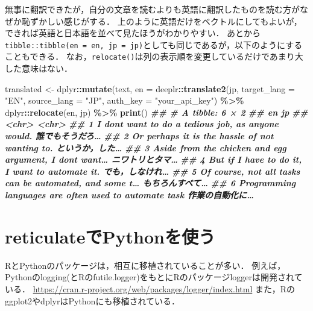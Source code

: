 \documentclass[
]{article}
\newenvironment{Shaded}{\begin{snugshade}}{\end{snugshade}}
\newcommand{\AttributeTok}[1]{\textcolor[rgb]{0.13,0.29,0.53}{#1}}
\newcommand{\DocumentationTok}[1]{\textcolor[rgb]{0.56,0.35,0.01}{\textbf{\textit{#1}}}}
\newcommand{\FunctionTok}[1]{\textcolor[rgb]{0.13,0.29,0.53}{\textbf{#1}}}
\newcommand{\NormalTok}[1]{#1}
\newcommand{\OtherTok}[1]{\textcolor[rgb]{0.56,0.35,0.01}{#1}}
\newcommand{\SpecialCharTok}[1]{\textcolor[rgb]{0.81,0.36,0.00}{\textbf{#1}}}
\newcommand{\StringTok}[1]{\textcolor[rgb]{0.31,0.60,0.02}{#1}}
\begin{document}
無事に翻訳できたが，自分の文章を読むよりも英語に翻訳したものを読む方がなぜか恥ずかしい感じがする．
上のように英語だけをベクトルにしてもよいが，できれば英語と日本語を並べて見たほうがわかりやすい．
あとから\texttt{tibble::tibble(en\ =\ en,\ jp\ =\ jp)}としても同じであるが，以下のようにすることもできる．
なお，\texttt{relocate()}は列の表示順を変更しているだけであまり大した意味はない．

\begin{Shaded}
\begin{Highlighting}[]
\NormalTok{translated }\OtherTok{\textless{}{-}} 
\NormalTok{  dplyr}\SpecialCharTok{::}\FunctionTok{mutate}\NormalTok{(text, }\AttributeTok{en =}\NormalTok{ deeplr}\SpecialCharTok{::}\FunctionTok{translate2}\NormalTok{(jp, }
    \AttributeTok{target\_lang =} \StringTok{"EN"}\NormalTok{, }\AttributeTok{source\_lang =} \StringTok{"JP"}\NormalTok{, }\AttributeTok{auth\_key =} \StringTok{"your\_api\_key"}\NormalTok{) }\SpecialCharTok{\%\textgreater{}\%}
\NormalTok{  dplyr}\SpecialCharTok{::}\FunctionTok{relocate}\NormalTok{(en, jp) }\SpecialCharTok{\%\textgreater{}\%}
  \FunctionTok{print}\NormalTok{()}
\DocumentationTok{\#\# \# A tibble: 6 × 2}
\DocumentationTok{\#\#   en                                                       jp}
\DocumentationTok{\#\#   \textless{}chr\textgreater{}                                                    \textless{}chr\textgreater{}}
\DocumentationTok{\#\# 1 I don\textquotesingle{}t want to do a tedious job, as anyone would.       誰でもそうだろ…}
\DocumentationTok{\#\# 2 Or perhaps it is the hassle of not wanting to.           というか，した…}
\DocumentationTok{\#\# 3 Aside from the chicken and egg argument, I don\textquotesingle{}t want…  ニワトリとタマ…}
\DocumentationTok{\#\# 4 But if I have to do it, I want to automate it.           でも，しなけれ…}
\DocumentationTok{\#\# 5 Of course, not all tasks can be automated, and some t…  もちろんすべて…}
\DocumentationTok{\#\# 6 Programming languages are often used to automate task    作業の自動化に…}
\end{Highlighting}
\end{Shaded}

\hypertarget{reticulate}{%
\section{reticulateでPythonを使う}\label{reticulate}}

RとPythonのパッケージは，相互に移植されていることが多い．
例えば，Pythonのlogging(とRのfutile.logger)をもとにRのパッケージloggerは開発されている．
\url{https://cran.r-project.org/web/packages/logger/index.html}
また，Rのggplot2やdplyrはPythonにも移植されている．
\end{document}
